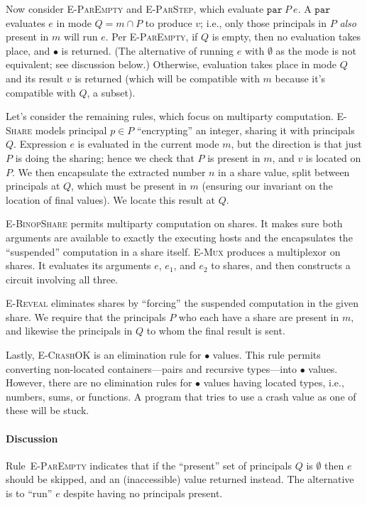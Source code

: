 \documentclass[10pt]{article}
\newcommand{\rulelab}[1]{{\small \textsc{#1}}}
\newcommand{\kw}[1]{\ensuremath{\mathtt{#1}}}
\newcommand{\epar}[2]{\ensuremath{\kw{par}~{#1}~{#2}}}
\newcommand{\vcrash}{\ensuremath{\bullet}}
\begin{document}
Now consider \rulelab{E-ParEmpty} and \rulelab{E-ParStep}, which
evaluate $\epar{P}{e}$. A $\kw{par}$ evaluates $e$ in mode
$Q = m \cap P$ to produce $v$; i.e., only those principals in $P$
\emph{also} present in $m$ will run $e$. Per \rulelab{E-ParEmpty}, if
$Q$ is empty, then no evaluation takes place, and $\vcrash$ is
returned. (The alternative of running $e$ with $\emptyset$ as the
mode is not equivalent; see discussion below.)  Otherwise, evaluation
takes place in mode $Q$ and its result $v$ is returned (which will be
compatible with $m$ because it's compatible with $Q$, a subset).

Let's consider the remaining rules, which focus on multiparty
computation. \rulelab{E-Share} models principal $p \in P$
``encrypting'' an integer, sharing it with principals $Q$. Expression
$e$ is evaluated in the current mode $m$, but the direction is that
just $P$ is doing the sharing; hence we check that $P$ is present in
$m$, and $v$ is located
on $P$. We then encapsulate the extracted number $n$ in a share value,
split between principals at $Q$, which must be present in $m$
(ensuring our invariant on the location of final values). We locate
this result at $Q$.

\rulelab{E-BinopShare} permits multiparty computation on shares. It
makes sure both arguments are available to exactly the executing hosts
and the encapsulates the ``suspended'' computation in a share
itself. \rulelab{E-Mux} produces a multiplexor on shares. It evaluates
its arguments $e$, $e_1$, and $e_2$ to shares, and then constructs a
circuit involving all three.

\rulelab{E-Reveal} eliminates shares by ``forcing'' the suspended
computation in the given share. We require that the principals $P$ who
each have a share are present in $m$, and likewise the principals in
$Q$ to whom the final result is sent.

Lastly, \rulelab{E-CrashOK} is an elimination rule for $\vcrash$
values. This rule permits converting non-located containers---pairs
and recursive types---into $\vcrash$ values. However, there are no
elimination rules for $\vcrash$ values having located types, i.e.,
numbers, sums, or functions. A program that tries to use a crash value
as one of these will be stuck.

\paragraph{Discussion}

Rule~\rulelab{E-ParEmpty} indicates that if the ``present'' set of
principals $Q$ is $\emptyset$ then $e$ should be skipped, and an
(inaccessible) value returned instead. The alternative is to ``run''
$e$ despite having no principals present.
\end{document}
